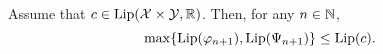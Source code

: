 \documentclass[11pt,a4paper]{article}
\begin{document}

\begin{proposition}
  \label{prop:bound_1}
  Assume that $c \in\operatorname{Lip}(\mathcal{X}\times\mathcal{Y}, \mathbb{R})$. Then, for any
  $n \in \mathbb{N}$,
  \begin{equation}
    \max\{ \operatorname{Lip}( \varphi_{n+1}), \operatorname{Lip}(\Psi_{n+1}) \} \leq \operatorname{Lip}( c). 
  \end{equation}
\end{proposition}
\end{document}
